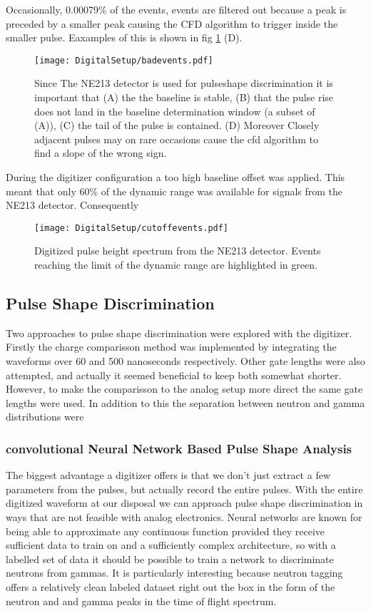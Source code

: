 \documentclass[main.tex]{subfiles}
\begin{document}
Occasionally, 0.00079\% of the events, events are filtered out because a peak is preceded by a smaller peak causing the CFD algorithm to trigger inside the smaller pulse. Eaxamples of this is shown in fig \ref{fig:badevents} (D).
\begin{figure}[ht!]
    \centering
        \texttt{[image: DigitalSetup/badevents.pdf]}
        \caption{Since The NE213 detector is used for pulseshape discrimination it is important that (A) the the baseline is stable, (B) that the pulse rise does not land in the baseline determination window (a subset of (A)), (C) the tail of the pulse is contained. (D) Moreover Closely adjacent pulses may on rare occasions cause the cfd algorithm to find a slope of the wrong sign.}
    \label{fig:badevents} 
\end{figure}

During the digitizer configuration a too high baseline offset was applied. This meant that only 60\% of the dynamic range was available for signals from the NE213 detector. Consequently 

\begin{figure}[ht!]
    \centering
        \texttt{[image: DigitalSetup/cutoffevents.pdf]}
        \caption{Digitized pulse height spectrum from the NE213 detector. Events reaching the limit of the dynamic range are highlighted in green.}
    \label{fig:cutoffevents} 
\end{figure}


\subsection{Pulse Shape Discrimination}
Two approaches to pulse shape discrimination were explored with the digitizer. Firstly the charge comparisson method was implemented by integrating the waveforms over 60 and 500 nanoseconds respectively. Other gate lengths were also attempted, and actually it seemed beneficial to keep both somewhat shorter. However, to make the comparisson to the analog setup more direct the same gate lengths were used. In addition to this the separation between neutron and gamma distributions were 
\subsubsection{convolutional Neural Network Based Pulse Shape Analysis}
The biggest advantage a digitizer offers is that we don't just extract a few parameters from the pulses, but actually record the entire pulses. With the entire digitized waveform at our disposal we can approach pulse shape discrimination in ways that are not feasible with analog electronics. Neural networks are known for being able to approximate any continuous function provided they receive sufficient data to train on and a sufficiently complex architecture, so with a labelled set of data it should be possible to train a network to discriminate neutrons from gammas. It is particularly interesting because neutron tagging offers a relatively clean labeled dataset right out the box in the form of the neutron and and gamma peaks in the time of flight spectrum. 
\end{document}
